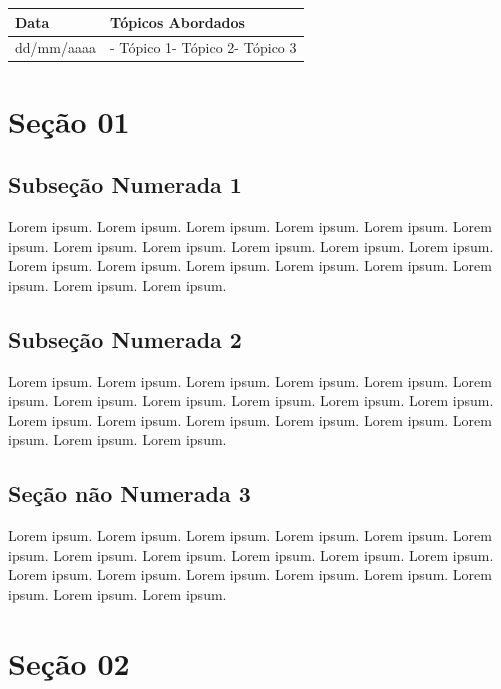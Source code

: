 \documentclass[
]{book}
\begin{document}
\begin{longtable}[]{@{}ll@{}}
\toprule()
Data & Tópicos Abordados \\
\midrule()
\endhead
dd/mm/aaaa & - Tópico 1- Tópico 2- Tópico 3 \\
\bottomrule()
\end{longtable}

\hypertarget{seuxe7uxe3o-01-1}{%
\section{Seção 01}\label{seuxe7uxe3o-01-1}}

\hypertarget{subseuxe7uxe3o-numerada-1-2}{%
\subsection{Subseção Numerada 1}\label{subseuxe7uxe3o-numerada-1-2}}

Lorem ipsum. Lorem ipsum. Lorem ipsum. Lorem ipsum. Lorem ipsum. Lorem ipsum. Lorem ipsum. Lorem ipsum. Lorem ipsum. Lorem ipsum. Lorem ipsum. Lorem ipsum. Lorem ipsum. Lorem ipsum. Lorem ipsum. Lorem ipsum. Lorem ipsum. Lorem ipsum. Lorem ipsum.

\hypertarget{subseuxe7uxe3o-numerada-2-2}{%
\subsection{Subseção Numerada 2}\label{subseuxe7uxe3o-numerada-2-2}}

Lorem ipsum. Lorem ipsum. Lorem ipsum. Lorem ipsum. Lorem ipsum. Lorem ipsum. Lorem ipsum. Lorem ipsum. Lorem ipsum. Lorem ipsum. Lorem ipsum. Lorem ipsum. Lorem ipsum. Lorem ipsum. Lorem ipsum. Lorem ipsum. Lorem ipsum. Lorem ipsum. Lorem ipsum.

\hypertarget{seuxe7uxe3o-nuxe3o-numerada-3-2}{%
\subsection*{Seção não Numerada 3}\label{seuxe7uxe3o-nuxe3o-numerada-3-2}}

Lorem ipsum. Lorem ipsum. Lorem ipsum. Lorem ipsum. Lorem ipsum. Lorem ipsum. Lorem ipsum. Lorem ipsum. Lorem ipsum. Lorem ipsum. Lorem ipsum. Lorem ipsum. Lorem ipsum. Lorem ipsum. Lorem ipsum. Lorem ipsum. Lorem ipsum. Lorem ipsum. Lorem ipsum.

\hypertarget{seuxe7uxe3o-02-1}{%
\section{Seção 02}\label{seuxe7uxe3o-02-1}}
\end{document}
